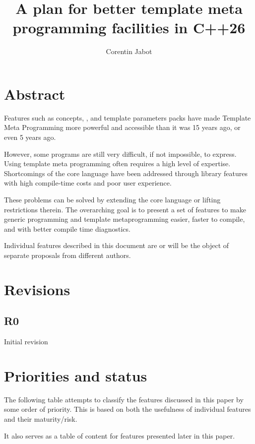 \documentclass{wg21}
\title{A plan for better template meta programming facilities in C++26}
\author{Corentin Jabot}{corentin.jabot@gmail.com}
\begin{document}
\maketitle

\section{Abstract}

Features such as concepts, , and template parameters packs have made Template Meta Programming more powerful and accessible than it was 15 years ago, or even 5 years ago.

However, some programs are still very difficult, if not impossible, to express. Using template meta programming often requires a high level of expertise.
Shortcomings of the core language have been addressed through library features with high compile-time costs and poor user experience.

These problems can be solved by extending the core language or lifting restrictions therein.
The overarching goal is to present a set of features to make generic programming and template metaprogramming easier, faster to compile, and with better compile time diagnostics.

Individual features described in this document are or will be the object of separate proposals from different authors.

\section{Revisions}

\subsection{R0}

Initial revision

\pagebreak
\setcounter{tocdepth}{2}

\pagebreak

\section{Priorities and status}

The following table attempts to classify the features discussed in this paper by some order of priority.
This is based on both the usefulness of individual features and their maturity/risk.

It also serves as a table of content for features presented later in this paper.
\end{document}
